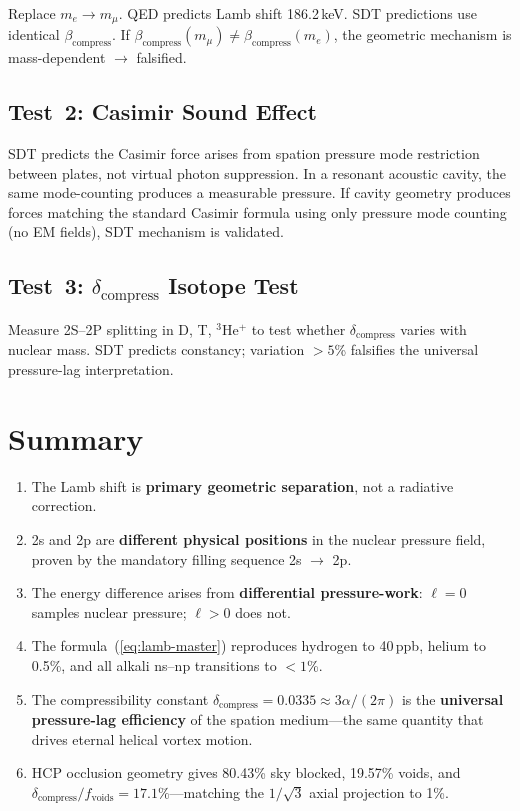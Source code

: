 Replace $m_e \to m_\mu$.  QED predicts Lamb shift 186.2\,keV.  SDT predictions use identical $\beta_{\text{compress}}$.  If $\beta_{\text{compress}}(m_\mu) \neq \beta_{\text{compress}}(m_e)$, the geometric mechanism is mass-dependent $\to$ falsified.

\subsection{Test~2: Casimir Sound Effect}

SDT predicts the Casimir force arises from spation pressure mode restriction between plates, not virtual photon suppression.  In a resonant acoustic cavity, the same mode-counting produces a measurable pressure.  If cavity geometry produces forces matching the standard Casimir formula using only pressure mode counting (no EM fields), SDT mechanism is validated.

\subsection{Test~3: $\delta_{\text{compress}}$ Isotope Test}

Measure 2S--2P splitting in D, T, ${}^3$He$^+$ to test whether $\delta_{\text{compress}}$ varies with nuclear mass.  SDT predicts constancy; variation $>5$\% falsifies the universal pressure-lag interpretation.


\section{Summary}

\begin{enumerate}
  \item The Lamb shift is \textbf{primary geometric separation}, not a radiative correction.
  \item 2s and 2p are \textbf{different physical positions} in the nuclear pressure field, proven by the mandatory filling sequence 2s $\to$ 2p.
  \item The energy difference arises from \textbf{differential pressure-work}: $\ell = 0$ samples nuclear pressure; $\ell > 0$ does not.
  \item The formula~(\ref{eq:lamb-master}) reproduces hydrogen to 40\,ppb, helium to 0.5\%, and all alkali ns--np transitions to $<1$\%.
  \item The compressibility constant $\delta_{\text{compress}} = 0.0335 \approx 3\alpha/(2\pi)$ is the \textbf{universal pressure-lag efficiency} of the spation medium---the same quantity that drives eternal helical vortex motion.
  \item HCP occlusion geometry gives 80.43\% sky blocked, 19.57\% voids, and $\delta_{\text{compress}}/f_{\text{voids}} = 17.1\%$---matching the $1/\sqrt{3}$ axial projection to 1\%.
\end{enumerate}


